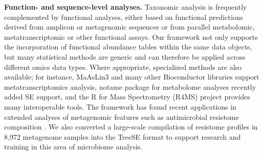 \documentclass[
  sn-nature,
]{sn-jnl}
\begin{document}
\textbf{Function- and sequence-level analyses.} Taxonomic analysis is
frequently complemented by functional analyses, either based on
functional predictions derived from amplicon or metagenomic sequences or
from parallel metabolomic, metatranscriptomic or other functional
assays. Our framework not only supports the incorporation of functional
abundance tables within the same data objects, but many statistical
methods are generic and can therefore be applied across different omics
data types. Where appropriate, specialized methods are also available;
for instance, MaAsLin3 \citep{nickols2026} and many other Bioconductor
libraries support metatranscriptomics analysis, notame package
\citep{klavus2020} for metabolome analyses recently added SE support,
and the R for Mass Spectrometry (R4MS) project provides many
interoperable tools. The framework has found recent applications in
extended analyses of metagenomic features such as antimicrobial
resistome composition \citep{salehi2025}. We also converted a
large-scale compilation of resistome profiles in 8,972 metagenome
samples \citep{lee2023} into the TreeSE format to support research and
training in this area of microbiome analysis.
\end{document}
